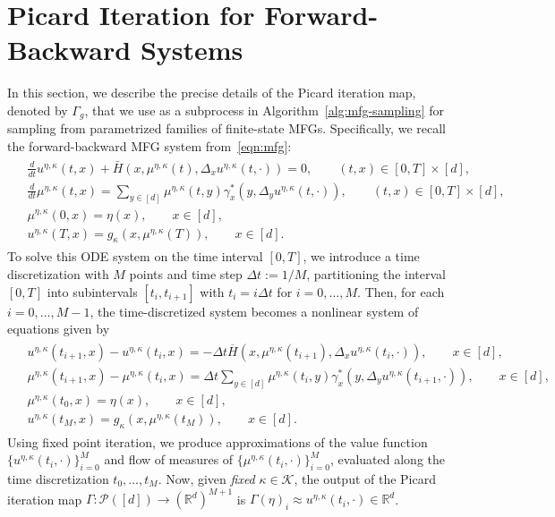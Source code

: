 \documentclass[11pt,reqno]{amsart}
\numberwithin{equation}{section}
\theoremstyle{plain}
\newcommand{\R}{\mathbb{R}}
\newcommand{\calK}{{\mathcal K}}
\newcommand{\calP}{{\mathcal P}}
\newcommand{\1}{\boldsymbol{\mathbbm{1}}}
\begin{document}
\section{Picard Iteration for Forward-Backward Systems}
\label{sec:picard}
In this section, we describe the precise details of the Picard iteration map, denoted by $\Gamma_g$, that we use as a subprocess in Algorithm~\ref{alg:mfg-sampling} for sampling from parametrized families of finite-state MFGs. Specifically, we recall the forward-backward MFG system from~\eqref{eqn:mfg}:
\begin{align*}
    \begin{split}
    &\frac{d}{dt} u^{\eta, \kappa} (t,x) + \bar H(x, \mu^{\eta, \kappa}(t), \Delta_x u^{\eta, \kappa} (t,\cdot)) = 0, \qquad (t,x) \in [0, T] \times [d],\\ 
    &\frac{d}{dt} \mu^{\eta, \kappa} (t,x) = \sum_{y\in [d]} \mu^{\eta, \kappa} (t,y) \gamma^*_x(y,\Delta_y u^{\eta, \kappa} (t,\cdot)), \qquad (t,x) \in [0, T] \times [d] ,\\ 
    &\mu^{\eta, \kappa} (0, x) = \eta(x), \qquad x \in [d], \\ 
    &u^{\eta, \kappa}(T,x) = g_\kappa(x,\mu^{\eta, \kappa} (T)), \qquad x \in [d].
\end{split}
\end{align*}
To solve this ODE system on the time interval $[0, T]$, we introduce a time discretization with $M$ points and time step $\Delta t := 1 / M$, partitioning the interval $[0, T]$ into subintervals $[t_i, t_{i+ 1}]$ with $t_i = i \Delta t$ for $i = 0, \ldots, M$. Then, for each $i = 0, \ldots, M - 1$, the time-discretized system becomes a nonlinear system of equations given by
\begin{align}
\begin{split}\label{eqn:time-disc-mfg}
    &u^{\eta, \kappa}(t_{i+1}, x) - u^{\eta, \kappa}(t_i, x) = -\Delta t \overline{H}(x, \mu^{\eta, \kappa}(t_{i+1}), \Delta_x u^{\eta, \kappa}(t_i, \cdot)), \qquad x \in [d], \\
    &\mu^{\eta, \kappa}(t_{i+1}, x) - \mu^{\eta, \kappa}(t_i, x) = \Delta t \sum_{y \in [d]}  \mu^{\eta, \kappa} (t_i, y) \gamma^*_x(y,\Delta_y u^{\eta, \kappa} (t_{i+1},\cdot)), \qquad x \in [d], \\
    &\mu^{\eta, \kappa}(t_0, x) = \eta(x), \qquad x \in [d], \\
    &u^{\eta, \kappa}(t_{M}, x) = g_{\kappa}(x, \mu^{\eta, \kappa}(t_M)), \qquad x \in [d].
\end{split}
\end{align}
Using fixed point iteration, we produce approximations of the value function $\{u^{\eta, \kappa}(t_i, \cdot)\}_{i=0}^{M}$ and flow of measures of $\{\mu^{\eta, \kappa}(t_i, \cdot)\}_{i=0}^{M}$, evaluated along the time discretization $t_0, \ldots, t_M$. Now, given \textit{fixed} $\kappa \in \calK$, the output of the Picard iteration map $\Gamma : \calP([d]) \to (\R^d)^{M + 1}$ is $\Gamma(\eta)_i \approx u^{\eta, \kappa}(t_i, \cdot) \in \R^d$.
\end{document}
